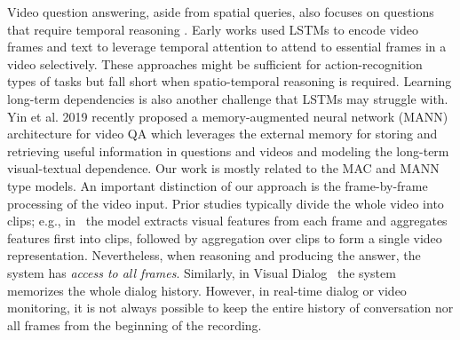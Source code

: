 Video question answering, aside from spatial queries, also focuses on questions that require temporal reasoning .  Early works \cite{mun2017marioqa, xu2017video, yu2017end} used LSTMs to encode video frames and text to leverage temporal attention to attend to essential frames in a video selectively.   These approaches might be sufficient for action-recognition types of tasks but fall short when spatio-temporal reasoning is required.  Learning long-term dependencies is also another challenge that LSTMs may struggle with.  Yin et al. 2019 \cite{yin2019memory} recently proposed a memory-augmented neural network (MANN) architecture for video QA which leverages the external memory for storing and retrieving useful information in questions and videos and modeling the long-term visual-textual dependence.
Our work is mostly related to the MAC and MANN type models. An important distinction of our approach is the frame-by-frame processing of the video input.  Prior studies typically divide the whole video into clips; e.g., in~\cite{song2018explore} the model extracts visual features from each frame and aggregates features first into clips, followed by aggregation over clips to form a single video representation.
Nevertheless, when reasoning and producing the answer, the system has \textit{access to all frames}.  Similarly, in Visual Dialog~\cite{das2017visual} the system memorizes the whole dialog history. However, in real-time dialog or video monitoring, it is not always possible to keep the entire history of conversation nor all frames from the beginning of the recording. 